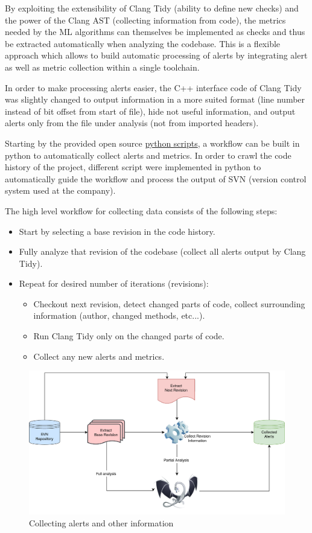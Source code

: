 \documentclass{article}
\begin{document}
By exploiting the extensibility of Clang Tidy (ability to define new checks) and the power of the Clang AST (collecting information from code), the metrics needed by the ML algorithms can themselves be implemented as checks and thus be extracted automatically when analyzing the codebase. This is a flexible approach which allows to build automatic processing of alerts by integrating alert as well as metric collection within a single toolchain.

In order to make processing alerts easier, the C++ interface code of Clang Tidy was slightly changed to output information in a more suited format (line number instead of bit offset from start of file), hide not useful information, and output alerts only from the file under analysis (not from imported headers).

Starting by the provided open source \href{https://github.com/llvm-mirror/clang-tools-extra/blob/master/clang-tidy/tool/run-clang-tidy.py}{python scripts}, a workflow can be built in python to automatically collect alerts and metrics. In order to crawl the code history of the project, different script were implemented in python to automatically guide the workflow and process the output of SVN (version control system used at the company).

The high level workflow for collecting data consists of the following steps:
\begin{itemize}
    \item Start by selecting a base revision in the code history.
    \item Fully analyze that revision of the codebase (collect all alerts output by Clang Tidy).
    \item Repeat for desired number of iterations (revisions):
        \begin{itemize}
            \item Checkout next revision, detect changed parts of code, collect surrounding information (author, changed methods, etc...).
            \item Run Clang Tidy only on the changed parts of code.
            \item Collect any new alerts and metrics.
        \end{itemize} 
\end{itemize}


\begin{figure}[H]
	\centering
	\includegraphics[scale=0.2]{./src/collect_info.png}
	\caption{Collecting alerts and other information}
\end{figure}
\end{document}
